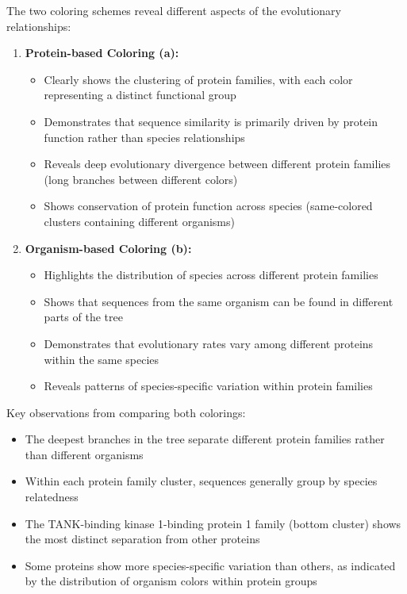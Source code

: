 \documentclass[11pt, a4paper, hidelinks]{article}
\begin{document}
The two coloring schemes reveal different aspects of the evolutionary relationships:

\begin{enumerate}
    \item \textbf{Protein-based Coloring (a):}
    \begin{itemize}
        \item Clearly shows the clustering of protein families, with each color representing a distinct functional group
        \item Demonstrates that sequence similarity is primarily driven by protein function rather than species relationships
        \item Reveals deep evolutionary divergence between different protein families (long branches between different colors)
        \item Shows conservation of protein function across species (same-colored clusters containing different organisms)
    \end{itemize}

    \item \textbf{Organism-based Coloring (b):}
    \begin{itemize}
        \item Highlights the distribution of species across different protein families
        \item Shows that sequences from the same organism can be found in different parts of the tree
        \item Demonstrates that evolutionary rates vary among different proteins within the same species
        \item Reveals patterns of species-specific variation within protein families
    \end{itemize}
\end{enumerate}

Key observations from comparing both colorings:
\begin{itemize}
    \item The deepest branches in the tree separate different protein families rather than different organisms
    \item Within each protein family cluster, sequences generally group by species relatedness
    \item The TANK-binding kinase 1-binding protein 1 family (bottom cluster) shows the most distinct separation from other proteins
    \item Some proteins show more species-specific variation than others, as indicated by the distribution of organism colors within protein groups
\end{itemize}
\end{document}
